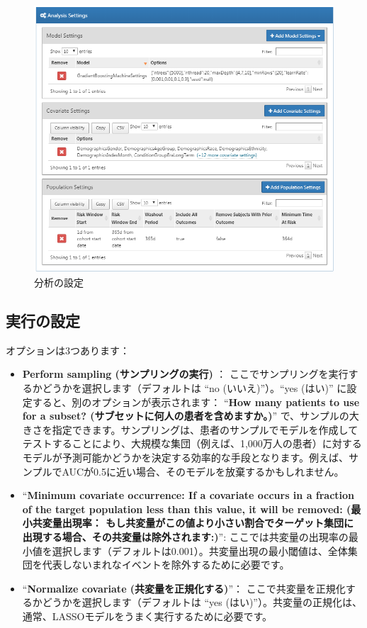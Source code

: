 \documentclass[
  11pt]{book}
\theoremstyle{definition}
\theoremstyle{definition}
\theoremstyle{definition}
\theoremstyle{definition}
\theoremstyle{remark}
\begin{document}
\begin{figure}

{\centering \includegraphics[width=1\linewidth]{images/PatientLevelPrediction/analysisSettings} 

}

\caption{分析の設定}\label{fig:analysisSettings}
\end{figure}

\subsection{実行の設定}\label{ux5b9fux884cux306eux8a2dux5b9a}

オプションは3つあります：

\begin{itemize}
\item
  \textbf{Perform sampling (サンプリングの実行)} ： ここでサンプリングを実行するかどうかを選択します（デフォルトは ``no (いいえ)''）。``yes (はい)'' に設定すると、別のオプションが表示されます： ``\textbf{How many patients to use for a subset? (サブセットに何人の患者を含めますか。)}'' で、サンプルの大きさを指定できます。サンプリングは、患者のサンプルでモデルを作成してテストすることにより、大規模な集団（例えば、1,000万人の患者）に対するモデルが予測可能かどうかを決定する効率的な手段となります。例えば、サンプルでAUCが0.5に近い場合、そのモデルを放棄するかもしれません。
\item
  ``\textbf{Minimum covariate occurrence: If a covariate occurs in a fraction of the target population less than this value, it will be removed: (最小共変量出現率： もし共変量がこの値より小さい割合でターゲット集団に出現する場合、その共変量は除外されます:)}'': ここでは共変量の出現率の最小値を選択します（デフォルトは0.001）。共変量出現の最小閾値は、全体集団を代表しないまれなイベントを除外するために必要です。
\item
  ``\textbf{Normalize covariate (共変量を正規化する)}''： ここで共変量を正規化するかどうかを選択します（デフォルトは ``yes (はい)''）。共変量の正規化は、通常、LASSOモデルをうまく実行するために必要です。
\end{itemize}
\end{document}
